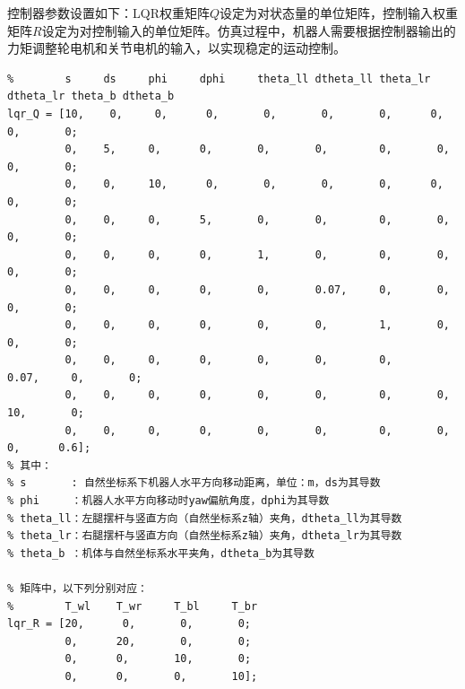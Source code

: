 \documentclass[
  oneside,
  degree=bachelor,
  fullwidthstop=false,
  fontset=fandol,
  times=false,
  minted=true,
  biblatex=true,
]{tongjithesis}
\begin{document}
控制器参数设置如下：LQR权重矩阵$Q$设定为对状态量的单位矩阵，控制输入权重矩阵$R$设定为对控制输入的单位矩阵。仿真过程中，机器人需要根据控制器输出的力矩调整轮电机和关节电机的输入，以实现稳定的运动控制。
\begin{verbatim}
%        s     ds     phi     dphi     theta_ll dtheta_ll theta_lr dtheta_lr theta_b dtheta_b
lqr_Q = [10,    0,     0,      0,       0,       0,       0,      0,       0,       0;
         0,    5,     0,      0,       0,       0,        0,       0,        0,       0;
         0,    0,     10,      0,       0,       0,       0,      0,       0,       0;
         0,    0,     0,      5,       0,       0,        0,       0,        0,       0;
         0,    0,     0,      0,       1,       0,        0,       0,        0,       0;
         0,    0,     0,      0,       0,       0.07,     0,       0,        0,       0;
         0,    0,     0,      0,       0,       0,        1,       0,        0,       0;
         0,    0,     0,      0,       0,       0,        0,       0.07,     0,       0;
         0,    0,     0,      0,       0,       0,        0,       0,        10,       0;
         0,    0,     0,      0,       0,       0,        0,       0,        0,      0.6];
% 其中：
% s       : 自然坐标系下机器人水平方向移动距离，单位：m，ds为其导数
% phi     ：机器人水平方向移动时yaw偏航角度，dphi为其导数
% theta_ll：左腿摆杆与竖直方向（自然坐标系z轴）夹角，dtheta_ll为其导数
% theta_lr：右腿摆杆与竖直方向（自然坐标系z轴）夹角，dtheta_lr为其导数
% theta_b ：机体与自然坐标系水平夹角，dtheta_b为其导数

% 矩阵中，以下列分别对应：
%        T_wl    T_wr     T_bl     T_br
lqr_R = [20,      0,       0,       0;
         0,      20,       0,       0;
         0,      0,       10,       0;
         0,      0,       0,       10];
\end{verbatim}
\end{document}
